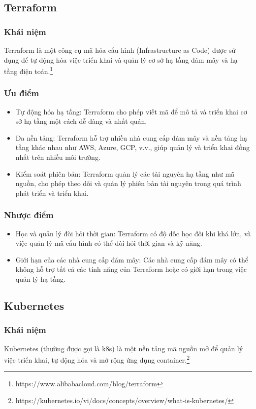 \subsection{Terraform}
\subsubsection{Khái niệm}
\indent Terraform là một công cụ mã hóa cấu hình (Infrastructure as Code) được sử dụng để tự động hóa việc triển khai và quản lý cơ sở hạ tầng đám mây và hạ tầng điện toán.\footnote{https://www.alibabacloud.com/blog/terraform}
\subsubsection{Ưu điểm}
\begin{itemize}
    \item Tự động hóa hạ tầng: 
    Terraform cho phép viết mã để mô tả và triển khai cơ sở hạ tầng một cách dễ dàng và nhất quán.
    \item Đa nền tảng: 
    Terraform hỗ trợ nhiều nhà cung cấp đám mây và nền tảng hạ tầng khác nhau như AWS, Azure, GCP, v.v., giúp quản lý và triển khai đồng nhất trên nhiều môi trường.
    \item Kiểm soát phiên bản: 
    Terraform quản lý các tài nguyên hạ tầng như mã nguồn, cho phép theo dõi và quản lý phiên bản tài nguyên trong quá trình phát triển và triển khai.
\end{itemize}
\subsubsection{Nhược điểm}
\begin{itemize}
    \item Học và quản lý đòi hỏi thời gian: Terraform có độ dốc học đôi khi khá lớn, và việc quản lý mã cấu hình có thể đòi hỏi thời gian và kỹ năng.
    \item Giới hạn của các nhà cung cấp đám mây: Các nhà cung cấp đám mây có thể không hỗ trợ tất cả các tính năng của Terraform hoặc có giới hạn trong việc quản lý hạ tầng.
\end{itemize}
\subsection{Kubernetes}
\subsubsection{Khái niệm}
\indent Kubernetes (thường được gọi là k8s) là một nền tảng mã nguồn mở để quản lý việc triển khai, tự động hóa và mở rộng ứng dụng container.\footnote{https://kubernetes.io/vi/docs/concepts/overview/what-is-kubernetes/}

